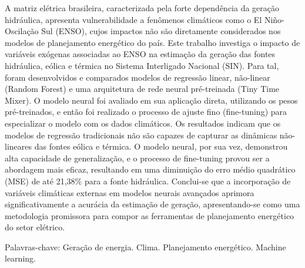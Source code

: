 \begin{resumo}
\noindent
A matriz elétrica brasileira, caracterizada pela forte dependência da geração hidráulica, apresenta vulnerabilidade a fenômenos
climáticos como o El Niño-Oscilação Sul (ENSO), cujos impactos não são diretamente considerados nos modelos de 
planejamento energético do país. Este trabalho investiga o impacto de variáveis exógenas associadas ao ENSO na estimação da geração 
das fontes hidráulica, eólica e térmica no Sistema Interligado Nacional (SIN). Para tal, foram desenvolvidos e comparados modelos de 
regressão linear, não-linear (Random Forest) e uma arquitetura de rede neural pré-treinada (Tiny Time Mixer). O modelo 
neural foi avaliado em sua aplicação direta, utilizando os pesos pré-treinados, e então foi realizado o processo de 
ajuste fino (fine-tuning) para especializar o modelo com os dados climáticos. Os resultados indicam que os modelos de regressão 
tradicionais não são capazes de capturar as dinâmicas não-lineares das fontes eólica e térmica. O modelo neural, por sua vez,
demonstrou alta capacidade de generalização, e o processo de fine-tuning provou ser a abordagem mais eficaz, resultando em uma diminuição 
do erro médio quadrático (MSE) de até 21,38\% para a fonte hidráulica. Conclui-se que a incorporação de variáveis climáticas externas 
em modelos neurais avançados aprimora significativamente a acurácia da estimação de geração, apresentando-se como uma metodologia promissora
para compor as ferramentas de planejamento energético do setor elétrico.

\vspace{0.2cm}
\noindent
Palavras-chave: Geração de energia. Clima. Planejamento energético. Machine learning.
\end{resumo}

